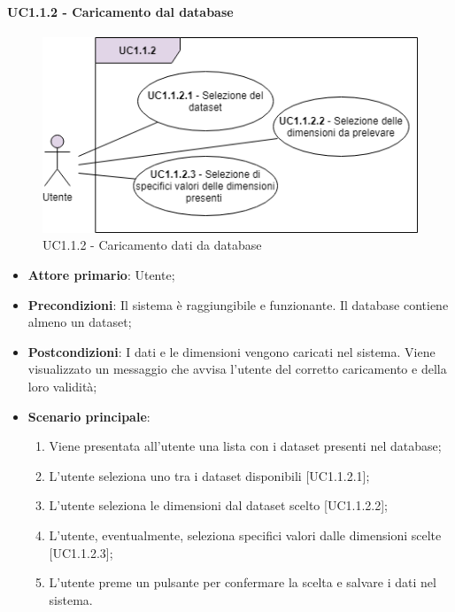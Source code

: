 \paragraph{UC1.1.2 - Caricamento dal database}

\mbox{}

\begin{figure}[h]
\includegraphics[width=12cm]{section/Images/UC1.1.2.png}
\centering
\caption{UC1.1.2 - Caricamento dati da database}
\end{figure}

\begin{itemize}
	\item \textbf{Attore primario}: Utente;
	\item \textbf{Precondizioni}: Il sistema è raggiungibile e funzionante. Il database contiene almeno un dataset;
	\item \textbf{Postcondizioni}: I dati e le dimensioni vengono caricati nel sistema. Viene visualizzato un messaggio che avvisa l'utente del corretto caricamento e della loro validità;
	\item \textbf{Scenario principale}: 
	\begin{enumerate}
			\item Viene presentata all'utente una lista con i dataset presenti nel database;
			\item L'utente seleziona uno tra i dataset disponibili [UC1.1.2.1];
			\item L'utente seleziona le dimensioni dal dataset scelto [UC1.1.2.2];
			\item L'utente, eventualmente, seleziona specifici valori dalle dimensioni scelte [UC1.1.2.3];
			\item L'utente preme un pulsante per confermare la scelta e salvare i dati nel sistema.
		\end{enumerate}
	
\end{itemize}

